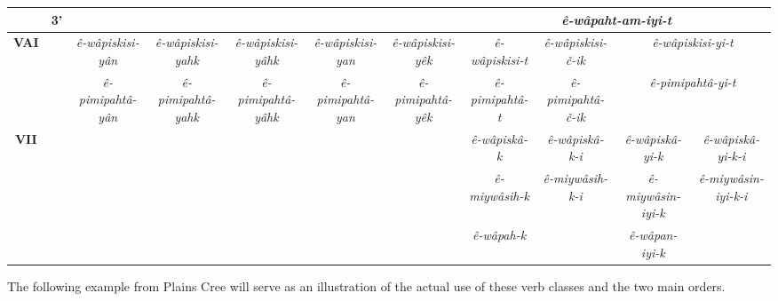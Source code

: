 \documentclass[twoside,a4paper,11pt]{article}
\newcommand{\ipa}[1]{{\phon\textit{#1}}}
\newcommand{\grise}[1]{\cellcolor{lightgray}\textbf{#1}}
\newcommand{\Σ}{\greek{Σ}}
\begin{document}
\begin{table}[H]
{\begin{tabular}{ccccccccccc}
& 3'  &\grise{}  & \grise{}  & \grise{}  &\grise{}  &  \grise{}  &\multicolumn{4}{c}{\ipa{ê-wâpaht-am-iyi-t} }\\ 
\bottomrule
\multirow{2}{*}{\textbf{VAI}}  &  & \ipa{ê-wâpiskisi-yân} & \ipa{ê-wâpiskisi-yahk} & \ipa{ê-wâpiskisi-yâhk} &\ipa{ê-wâpiskisi-yan} &\ipa{ê-wâpiskisi-yêk} & \ipa{ê-wâpiskisi-t} & \ipa{ê-wâpiskisi-č-ik} & \multicolumn{2}{c}{\ipa{ê-wâpiskisi-yi-t}} \\
& & \ipa{ê-pimipahtâ-yân} & \ipa{ ê-pimipahtâ-yahk} & \ipa{ê-pimipahtâ-yâhk} &\ipa{ ê-pimipahtâ-yan} &\ipa{ ê-pimipahtâ-yêk} & \ipa{ê-pimipahtâ-t} & \ipa{ê-pimipahtâ-č-ik} & \multicolumn{2}{c}{\ipa{ê-pimipahtâ-yi-t}}\\
\bottomrule
\multirow{2}{*}{\textbf{VII}} &  &  \grise{}  &  \grise{}  &  \grise{} & \grise{}  & \grise{}  & \ipa{ê-wâpiskâ-k} & \ipa{ê-wâpiskâ-k-i} & \ipa{ê-wâpiskâ-yi-k} & \ipa{ê-wâpiskâ-yi-k-i}\\
 & &  \grise{}  &  \grise{}  &  \grise{} & \grise{}  & \grise{}  & \ipa{ê-miywâsih-k} & \ipa{ê-miywâsih-k-i}& \ipa{ê-miywâsin-iyi-k} & \ipa{ê-miywâsin-iyi-k-i}\\
  & &  \grise{}  &  \grise{}  &  \grise{} & \grise{}  & \grise{}  & \ipa{ê-wâpah-k} &\grise{} & \ipa{ê-wâpan-iyi-k} & \grise{}\\
 \bottomrule
\end{tabular}
}
\end{table}


The following example from Plains Cree will serve as an illustration of the actual use of these verb classes and the two main orders.
\end{document}
